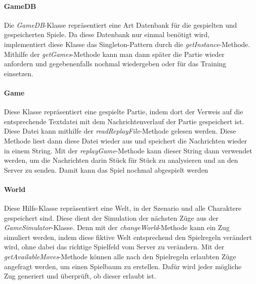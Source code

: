 \documentclass[12pt]{article}
\newcommand{\class}[1]{\textit{#1}-Klasse}
\newcommand{\method}[1]{\textit{#1}-Methode}
\newcounter{fa}
\newcounter{nfa}
\begin{document}
\paragraph{GameDB}
Die \class{GameDB} repräsentiert eine Art Datenbank für die gespielten und gespeicherten Spiele. Da diese Datenbank nur einmal benötigt wird, implementiert diese Klasse das Singleton-Pattern durch die \method{getInstance}. Mithilfe der \method{getGames} kann man dann später die Partie wieder anfordern und gegebenenfalls nochmal wiedergeben oder für das Training einsetzen. 
\paragraph{Game}
Diese Klasse repräsentiert eine gespielte Partie, indem dort der Verweis auf die entsprechende Textdatei mit dem Nachrichtenverlauf der Partie gespeichert ist. Diese Datei kann mithilfe der \method{readReplayFile} gelesen werden. Diese Methode liest dann diese Datei wieder aus und speichert die Nachrichten wieder in einem String. Mit der \method{replayGame} kann dieser String dann verwendet werden, um die Nachrichten darin Stück für Stück zu analysieren und an den Server zu senden. Damit kann das Spiel nochmal abgespielt werden
\paragraph{World}
Diese Hilfs-Klasse repräsentiert eine Welt, in der Szenario und alle Charaktere gespeichert sind. Diese dient der Simulation der nächsten Züge aus der \class{GameSimulator}. Denn mit der \method{changeWorld} kann ein Zug simuliert werden, indem diese fiktive Welt entsprechend den Spielregeln verändert wird,  ohne dabei das richtige Spielfeld vom Server zu verändern. Mit der \method{getAvailableMoves} können alle nach den Spielregeln erlaubten Züge angefragt werden, um einen Spielbaum zu erstellen. Dafür wird jeder mögliche Zug generiert und überprüft, ob dieser erlaubt ist.
\end{document}

